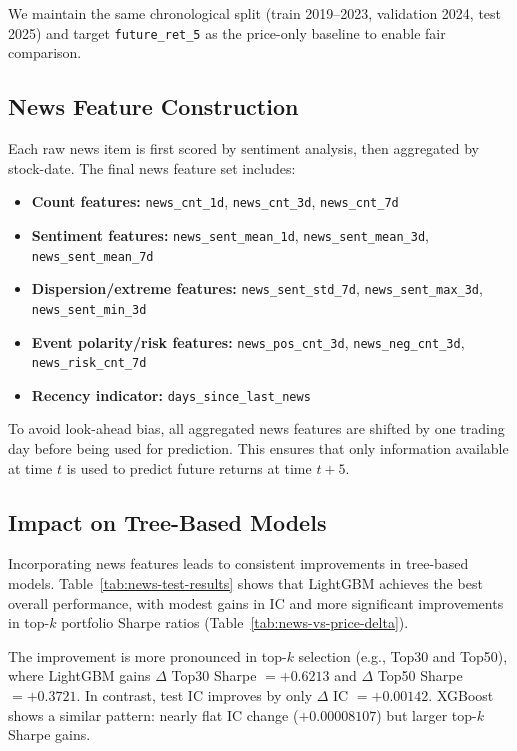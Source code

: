 We maintain the same chronological split (train 2019--2023, validation 2024, test 2025) and target \texttt{future\_ret\_5} as the price-only baseline to enable fair comparison.

\subsection{News Feature Construction}

Each raw news item is first scored by sentiment analysis, then aggregated by stock-date. The final news feature set includes:

\begin{itemize}
\item \textbf{Count features:} \texttt{news\_cnt\_1d}, \texttt{news\_cnt\_3d}, \texttt{news\_cnt\_7d}
\item \textbf{Sentiment features:} \texttt{news\_sent\_mean\_1d}, \texttt{news\_sent\_mean\_3d}, \texttt{news\_sent\_mean\_7d}
\item \textbf{Dispersion/extreme features:} \texttt{news\_sent\_std\_7d}, \texttt{news\_sent\_max\_3d}, \texttt{news\_sent\_min\_3d}
\item \textbf{Event polarity/risk features:} \texttt{news\_pos\_cnt\_3d}, \texttt{news\_neg\_cnt\_3d}, \texttt{news\_risk\_cnt\_7d}
\item \textbf{Recency indicator:} \texttt{days\_since\_last\_news}
\end{itemize}

To avoid look-ahead bias, all aggregated news features are shifted by one trading day before being used for prediction. This ensures that only information available at time $t$ is used to predict future returns at time $t+5$.

\subsection{Impact on Tree-Based Models}

Incorporating news features leads to consistent improvements in tree-based models. Table~\ref{tab:news-test-results} shows that LightGBM achieves the best overall performance, with modest gains in IC and more significant improvements in top-$k$ portfolio Sharpe ratios (Table~\ref{tab:news-vs-price-delta}).

The improvement is more pronounced in top-$k$ selection (e.g., Top30 and Top50), where LightGBM gains $\Delta$ Top30 Sharpe $= +0.6213$ and $\Delta$ Top50 Sharpe $= +0.3721$. In contrast, test IC improves by only $\Delta$ IC $= +0.00142$. XGBoost shows a similar pattern: nearly flat IC change ($+0.00008107$) but larger top-$k$ Sharpe gains. 

